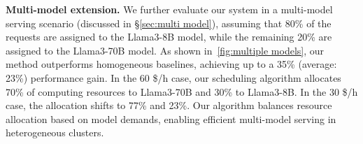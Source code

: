 \textbf{Multi-model extension.} 
We further evaluate our system in a multi-model serving scenario (discussed in \S\ref{sec:multi model}), assuming that 80\% of the requests are assigned to the Llama3-8B model, while the remaining 20\% are assigned to the Llama3-70B model. As shown in~\autoref{fig:multiple models}, our method outperforms homogeneous baselines, achieving up to a 35\% (average: 23\%) performance gain. In the 60 \$/h case, our scheduling algorithm allocates 70\% of computing resources to Llama3-70B and 30\% to Llama3-8B. In the 30 \$/h case, the allocation shifts to 77\% and 23\%. Our algorithm balances resource allocation based on model demands, enabling efficient multi-model serving in heterogeneous clusters.


